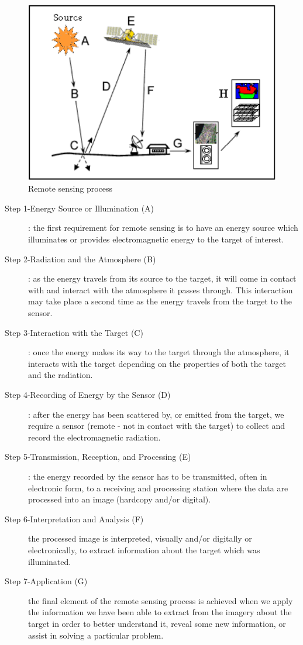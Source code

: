 \begin{figure}[H]
\begin{center}
\includegraphics[scale=0.8]{image0.png} %
\end{center}
\caption{Remote sensing process}
\label{Remote sensing process}%
\end{figure}
\begin{description}
\item[Step 1-Energy Source or Illumination (A)] : the first requirement for remote sensing is to have  an energy source which illuminates or  provides electromagnetic energy to the target of interest.
\item[Step 2-Radiation and the Atmosphere (B)]: as the energy travels from its source to the target, it will come in contact with and interact with the atmosphere it passes through. This interaction may take place a second time as  the energy travels from the target to the sensor. 
\item[Step 3-Interaction with the Target (C)] : once the energy makes its way to the target through the atmosphere, it interacts with the target depending on the properties of both the target and the radiation.
\item[Step 4-Recording of Energy by the Sensor (D)] : after the energy has been scattered by, or emitted from the target, we require a sensor (remote - not in contact with the target) to collect and record the electromagnetic radiation. 
\item[Step 5-Transmission, Reception, and Processing (E)]: the energy recorded by the sensor has to be transmitted, often in electronic form, to a receiving and processing station where the data are processed into an image (hardcopy and/or digital).
\item[Step 6-Interpretation and Analysis (F)] the processed image is interpreted, visually and/or  digitally or electronically, to extract information about the target which was illuminated. 
\item[Step 7-Application (G) ] the final element of the remote sensing process is achieved when we  apply the information we have been able to extract from the imagery about the target in order  to better understand it, reveal some new information, or assist in solving a particular problem. 
\end{description}
